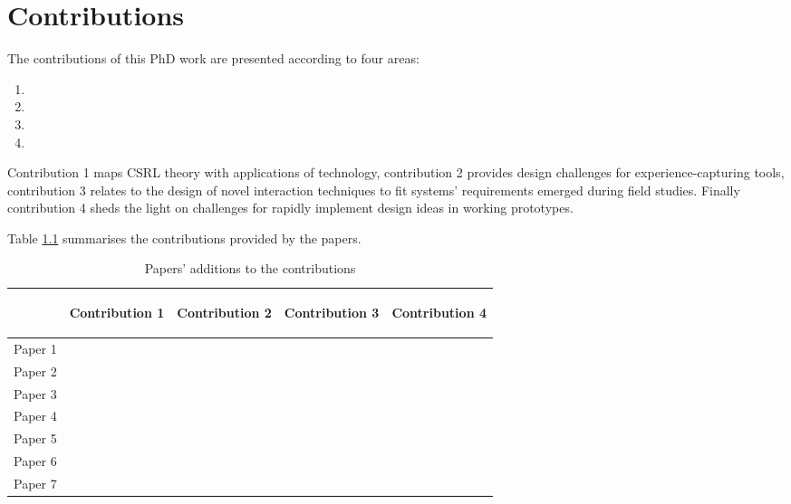 \chapter{Contributions}\label{contributions}

The contributions of this PhD work are presented according to four areas:

\begin{enumerate}
	\def\labelenumi{\arabic{enumi}.} 
	\itemsep1pt\parskip0pt 
	\item \Ci 
	\item \Cii 
	\item \Ciii 
	\item \Civ
\end{enumerate}

Contribution 1 maps CSRL theory with applications of technology, contribution 2 provides design challenges for experience-capturing tools, contribution 3 relates to the design of novel interaction techniques to fit systems' requirements emerged during field studies. Finally contribution 4 sheds the light on challenges for rapidly implement design ideas in working prototypes.

Table \ref{tab:papers-and-contributions} summarises the contributions provided by the papers.

\begin{table}[tbh] 
	\centering 
	\caption{Papers' additions to the contributions} 
	\label{tab:papers-and-contributions} 
	\smallskip
	\begin{tabular}{@{}lcccc@{}}
	\toprule
	  & \begin{turn}{90}Contribution 1\end{turn} & \begin{turn}{90}Contribution 2\end{turn} & \begin{turn}{90}Contribution 3\end{turn} & \begin{turn}{90}Contribution 4\end{turn} \\
	\midrule
	Paper 1 & & & \textbullet & \\
	Paper 2 & \textbullet & \textbullet & & \\
	Paper 3 & & \textbullet & \textbullet & \textbullet \\
	Paper 4 & \textbullet & & & \\
	Paper 5 & & & \textbullet & \textbullet \\
	Paper 6 & \textbullet & & & \\
	Paper 7 & & & & \textbullet \\
	\bottomrule 
	\end{tabular}
\end{table}

